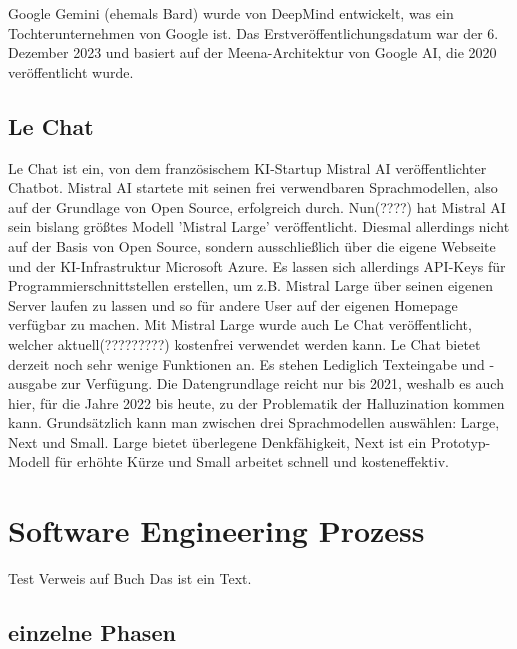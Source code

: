 Google Gemini (ehemals Bard) wurde von DeepMind entwickelt, was ein Tochterunternehmen von Google ist.  
Das Erstveröffentlichungsdatum war der 6. Dezember 2023 und basiert auf der Meena-Architektur von Google AI,  
die 2020 veröffentlicht wurde.

\subsection{Le Chat}  \label{Le Chat}

Le Chat ist ein, von dem französischem KI-Startup Mistral AI veröffentlichter Chatbot. Mistral AI startete mit  
seinen frei verwendbaren Sprachmodellen, also auf der Grundlage von Open Source, erfolgreich durch. Nun(????)  
hat Mistral AI sein bislang größtes Modell 'Mistral Large' veröffentlicht. Diesmal allerdings nicht auf der  
Basis von Open Source, sondern ausschließlich über die eigene Webseite und der KI-Infrastruktur Microsoft  
Azure. Es lassen sich allerdings API-Keys für Programmierschnittstellen erstellen, um z.B. Mistral Large über  
seinen eigenen Server laufen zu lassen und so für andere User auf der eigenen Homepage verfügbar zu machen.  
Mit Mistral Large wurde auch Le Chat veröffentlicht, welcher aktuell(?????????) kostenfrei verwendet werden kann.
Le Chat bietet derzeit noch sehr wenige Funktionen an. Es stehen Lediglich Texteingabe und -ausgabe zur Verfügung.  
Die Datengrundlage reicht nur bis 2021, weshalb es auch hier, für die Jahre 2022 bis heute, zu der Problematik der  
Halluzination kommen kann.
Grundsätzlich kann man zwischen drei Sprachmodellen auswählen: Large, Next und Small. Large bietet überlegene Denkfähigkeit,  
Next ist ein Prototyp-Modell für erhöhte Kürze und Small arbeitet schnell und kosteneffektiv. \cite{GrundlagenLeChat}

\section{Software Engineering Prozess}
Test Verweis auf Buch \cite{Sommerville10} Das ist ein Text.
\subsection{einzelne Phasen}  \label{einzelne Phasen}
